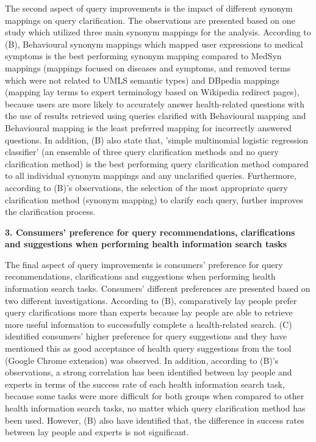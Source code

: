 \documentclass[]{article}
\begin{document}
The second aspect of query improvements is the impact of different synonym mappings on query clarification. The observations are presented based on one study which utilized three main synonym mappings for the analysis. According to (B), Behavioural synonym mappings which mapped user expressions to medical symptoms is the best performing synonym mapping compared to MedSyn mappings (mappings focused on diseases and symptoms, and removed terms which were not related to UMLS semantic types) and DBpedia  mappings (mapping lay terms to expert terminology based on Wikipedia redirect pages), because users are more likely to accurately answer health-related questions with the use of results retrieved using queries clarified with Behavioural mapping and Behavioural mapping is the least preferred mapping for incorrectly answered questions. In addition, (B) also state that, 'simple multinomial logistic regression classifier' (an ensemble of three query clarification methods and no query clarification method) is the best performing query clarification method compared to all individual synonym mappings and any unclarified queries. Furthermore, according to (B)'s observations, the selection of the most appropriate query clarification method (synonym mapping) to clarify each query, further improves the clarification process. 

\textbf{3. Consumers' preference for query recommendations, clarifications and suggestions when performing health information search tasks} 

The final aspect of query improvements is consumers' preference for query recommendations, clarifications and suggestions when performing health information search tasks. Consumers' different preferences are presented based on two different investigations. According to (B), comparatively lay people prefer query clarifications more than experts because lay people are able to retrieve  more useful information to successfully complete a health-related search. (C) identified consumers' higher preference for query suggestions and they have mentioned this as good acceptance of health query suggestions from the tool (Google Chrome extension) was observed. In addition, according to (B)'s observations, a strong correlation has been identified between lay people and experts in terms of the success rate of each health information search task,  because some tasks were more difficult for both groups when compared to other health information search tasks, no matter which query clarification method has been used. However, (B) also have identified that, the difference in success rates between lay people and experts is not significant. 
\end{document}
